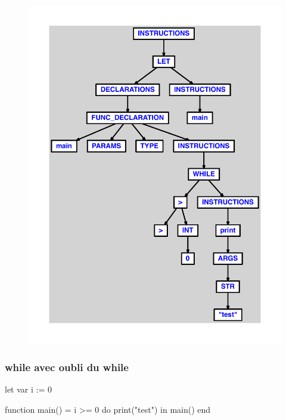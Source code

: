 \documentclass{article}
\begin{document}
\begin{figure}[H]\centering\includegraphics[max width=\textwidth]{ast/ast_316.pdf}\end{figure}\subsubsection{while avec oubli du while}
\begin{verbatimtab}
let
	var i := 0

	function main() =
		i >= 0 do
			print("test")
in main() end
\end{verbatimtab}
\end{document}

